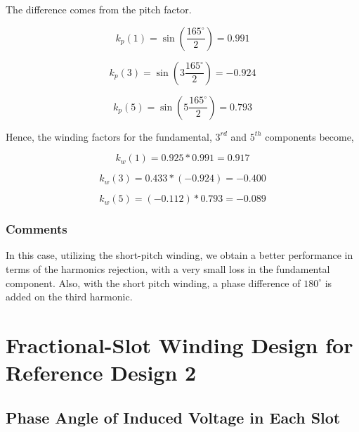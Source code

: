\documentclass[11pt]{report}
\begin{document}
The difference comes from the pitch factor.


\begin{equation}
    k_p(1)=\sin{(\frac{165^\circ}{2})}=0.991
\end{equation}


\begin{equation}
    k_p(3)=\sin{(3\frac{165^\circ}{2})}=-0.924
\end{equation}


\begin{equation}
    k_p(5)=\sin{(5\frac{165^\circ}{2})}=0.793
\end{equation}

Hence, the winding factors for the fundamental, $3^{rd}$ and $5^{th}$ components become,

\begin{equation}
    k_w(1) = 0.925*0.991=0.917
\end{equation}

\begin{equation}
    k_w(3) = 0.433 *(-0.924)=-0.400
\end{equation}

\begin{equation}
    k_w(5) = (-0.112)*0.793= -0.089
\end{equation}



\subsubsection*{Comments}

In this case, utilizing the short-pitch winding, we obtain a better performance in terms of the harmonics rejection, with a very small loss in the fundamental component. Also, with the short pitch winding, a phase difference of $180^\circ$ is added on the third harmonic. 



\section*{Fractional-Slot Winding Design for Reference Design 2}

\subsection*{Phase Angle of Induced Voltage in Each Slot}
\end{document}
